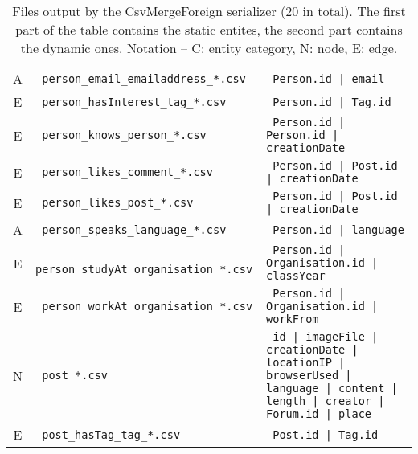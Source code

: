 \begin{table}[htb]
\begin{tabularx}{\linewidth}{|>{\sffamily}c|>{\tt}l|>{\tt}X|}
        A                    & person\_email\_emailaddress\_*.csv   & Person.id | email                                                                                                   \\
        E                    & person\_hasInterest\_tag\_*.csv      & Person.id | Tag.id                                                                                                  \\
        E                    & person\_knows\_person\_*.csv         & Person.id | Person.id | creationDate                                                                                \\
        E                    & person\_likes\_comment\_*.csv        & Person.id | Post.id | creationDate                                                                                  \\
        E                    & person\_likes\_post\_*.csv           & Person.id | Post.id | creationDate                                                                                  \\
        A                    & person\_speaks\_language\_*.csv      & Person.id | language                                                                                                \\
        E                    & person\_studyAt\_organisation\_*.csv & Person.id | Organisation.id | classYear                                                                             \\
        E                    & person\_workAt\_organisation\_*.csv  & Person.id | Organisation.id | workFrom                                                                              \\\hline
        N                    & post\_*.csv                          & id | imageFile | creationDate | locationIP | browserUsed | language | content | length | creator | Forum.id | place \\
        E                    & post\_hasTag\_tag\_*.csv             & Post.id | Tag.id                                                                                                    \\\hline
    \end{tabularx}
    \caption{Files output by the CsvMergeForeign serializer (20 in total). The first part of the table contains the static entites, the second part contains the dynamic ones.
        Notation -- \textsf{C}: entity category, \textsf{N}: node, \textsf{E}: edge.}
    \label{table:csv_merge_foreign}
\end{table}
